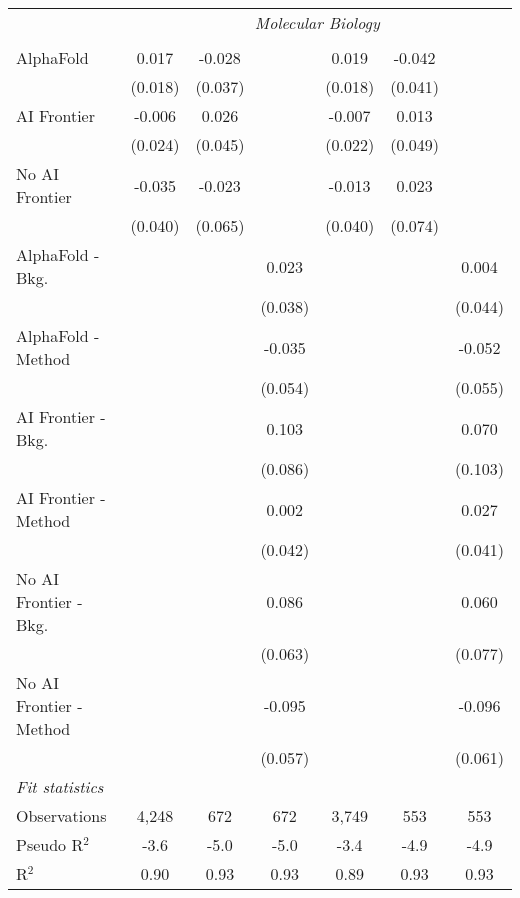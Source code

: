 \begin{tabular}{lcccccc}
 & \multicolumn{6}{c}{\textit{Molecular Biology}} \\ \\
   AlphaFold               & 0.017   & -0.028  &         & 0.019   & -0.042  &   \\   
                           & (0.018) & (0.037) &         & (0.018) & (0.041) &   \\   
   AI Frontier             & -0.006  & 0.026   &         & -0.007  & 0.013   &   \\   
                           & (0.024) & (0.045) &         & (0.022) & (0.049) &   \\   
   No AI Frontier          & -0.035  & -0.023  &         & -0.013  & 0.023   &   \\   
                           & (0.040) & (0.065) &         & (0.040) & (0.074) &   \\   
   AlphaFold - Bkg.        &         &         & 0.023   &         &         & 0.004\\   
                           &         &         & (0.038) &         &         & (0.044)\\   
   AlphaFold - Method      &         &         & -0.035  &         &         & -0.052\\   
                           &         &         & (0.054) &         &         & (0.055)\\   
   AI Frontier - Bkg.      &         &         & 0.103   &         &         & 0.070\\   
                           &         &         & (0.086) &         &         & (0.103)\\   
   AI Frontier - Method    &         &         & 0.002   &         &         & 0.027\\   
                           &         &         & (0.042) &         &         & (0.041)\\   
   No AI Frontier - Bkg.   &         &         & 0.086   &         &         & 0.060\\   
                           &         &         & (0.063) &         &         & (0.077)\\   
   No AI Frontier - Method &         &         & -0.095  &         &         & -0.096\\   
                           &         &         & (0.057) &         &         & (0.061)\\   
   \midrule
   \emph{Fit statistics}\\
   Observations            & 4,248   & 672     & 672     & 3,749   & 553     & 553\\  
   Pseudo R$^2$            & -3.6    & -5.0    & -5.0    & -3.4    & -4.9    & -4.9\\  
   R$^2$                   & 0.90    & 0.93    & 0.93    & 0.89    & 0.93    & 0.93\\  
   

\end{tabular}
